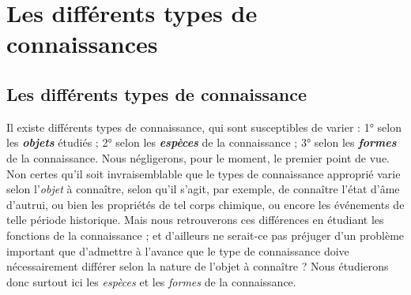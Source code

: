 \chapter{Les différents types de connaissances}

\section{Les différents types de connaissance}%
Il existe différents
types de connaissance, qui sont susceptibles de varier : 1° selon
les \textbf{\textit {objets}} étudiés ; 2° selon les \textbf{\textit {espèces}} de la connaissance ; 3° selon
les \textbf{\textit {formes}} de la connaissance. Nous négligerons, pour le moment, le
premier point de vue. Non certes qu’il soit invraisemblable que le
types de connaissance approprié varie selon l’{\it objet} à connaître, selon
qu’il s’agit, par exemple, de connaître l’état d’âme d’autrui, ou bien
les propriétés de tel corps chimique, ou encore les événements de
telle période historique. Mais nous retrouverons ces différences en
étudiant les fonctions de la connaissance ; et d’ailleurs ne serait-ce
pas préjuger d’un problème important que d'admettre à l’avance que
le type de connaissance doive nécessairement différer selon la nature
de l’objet à connaître ? Nous étudierons donc surtout ici les {\it espèces}
et les {\it formes} de la connaissance.

